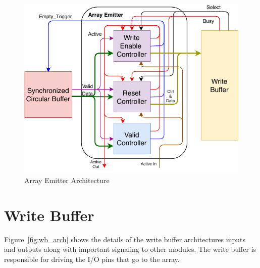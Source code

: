     \begin{figure}
        \centering
        \includegraphics[width=1.0\textwidth]{fig/pdp_ae_arch.pdf}
        \caption{Array Emitter Architecture}
        \label{fig:ae_arch}
    \end{figure}


\section{Write Buffer}
     Figure~\ref{fig:wb_arch} shows the details of the write buffer architectures inputs and outputs along with important signaling to other modules. The write buffer is responsible for driving the I/O pins that go to the array.

